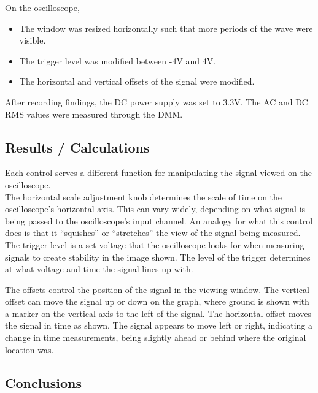 \documentclass[notitlepage, 12pt]{report}  %
\begin{document}
\noindent On the oscilloscope, 

\begin{itemize} %

    \item{The window was resized horizontally such that more periods of the wave were visible.}

    \item{The trigger level was modified between -4V and 4V.}

    \item{The horizontal and vertical offsets of the signal were modified.}
    
\end{itemize}

After recording findings, the DC power supply was set to 3.3V. The AC and DC RMS values were measured through 
the DMM.\\


\subsection*{Results / Calculations}

\indent\indent Each control serves a different function for manipulating the signal viewed on the oscilloscope. \\

The horizontal scale adjustment knob determines the scale of time on the oscilloscope's horizontal axis. 
This can vary widely, depending on what signal is being passed to the oscilloscope's input channel. 
An analogy for what this control does is that it ``squishes'' or ``stretches'' the view of the signal being measured. \\

The trigger level is a set voltage that the oscilloscope looks for when measuring signals to create stability in the
image shown. The level of the trigger determines at what voltage and time the signal lines up with. 

The offsets control the position of the signal in the viewing window. The vertical offset can move the signal up 
or down on the graph, where ground is shown with a marker on the vertical axis to the left of the signal. The
horizontal offset moves the signal in time as shown. The signal appears to move left or right, indicating a 
change in time measurements, being slightly ahead or behind where the original location was. \\




\subsection*{Conclusions}




\newpage

\printbibliography[title={\Large References}] %
\end{document}
